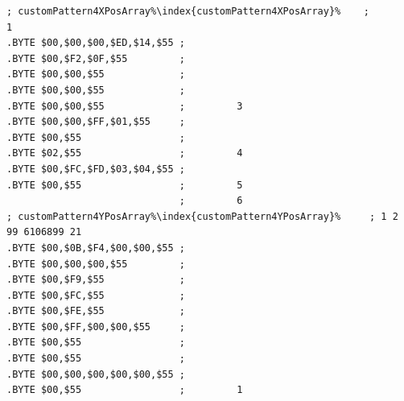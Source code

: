 \begin{minipage}[b]{0.42\linewidth}
\begin{lrbox}{\mybox}%
\begin{lstlisting}[basicstyle=\ttfamily\tiny,escapechar=\%]
 ; customPattern4XPosArray%\index{customPattern4XPosArray}%    ;         1             
.BYTE $00,$00,$00,$ED,$14,$55 ;                       
.BYTE $00,$F2,$0F,$55         ;                       
.BYTE $00,$00,$55             ;                       
.BYTE $00,$00,$55             ;                       
.BYTE $00,$00,$55             ;         3             
.BYTE $00,$00,$FF,$01,$55     ;                       
.BYTE $00,$55                 ;                       
.BYTE $02,$55                 ;         4             
.BYTE $00,$FC,$FD,$03,$04,$55 ;                       
.BYTE $00,$55                 ;         5             
                              ;         6             
; customPattern4YPosArray%\index{customPattern4YPosArray}%     ; 1 2 99 6106899 21    
.BYTE $00,$0B,$F4,$00,$00,$55 ;                       
.BYTE $00,$00,$00,$55         ;                       
.BYTE $00,$F9,$55             ;                       
.BYTE $00,$FC,$55             ;                       
.BYTE $00,$FE,$55             ;                       
.BYTE $00,$FF,$00,$00,$55     ;                       
.BYTE $00,$55                 ;                       
.BYTE $00,$55                 ;                       
.BYTE $00,$00,$00,$00,$00,$55 ;                       
.BYTE $00,$55                 ;         1             
\end{lstlisting}
\end{lrbox}%
\scalebox{0.8}{\usebox{\mybox}}

\end{minipage}


